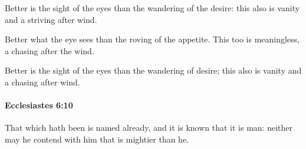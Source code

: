 			\begin{versebox}
					\item[BHS] 
					\item[LXX] 
					\item[ASV] Better is the sight of the eyes than the wandering of the desire: this also is vanity and a striving after wind.
					\item[NIV] Better what the eye sees than the roving of the appetite. This too is meaningless, a chasing after the wind.
					\item[NRSV] Better is the sight of the eyes than the wandering of desire; this also is vanity and a chasing after wind.
			\end{versebox}

		\paragraph{Ecclesiastes 6:10} %
			\label{ECCLESIASTES-6-10}

			That which hath been is named already, and it is known that it is man: neither may he contend with him that is mightier than he.

